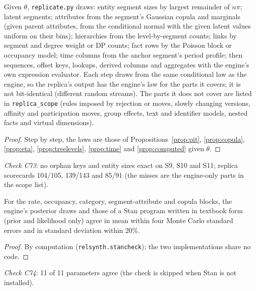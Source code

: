 \begin{proposition}\label{prop:replica}
Given $\theta$, \texttt{replicate.py} draws: entity segment sizes by largest remainder of $n\pi$; latent segments; attributes from the segment's Gaussian copula and marginals (given parent attributes, from the conditional normal with the given latent values uniform on their bins); hierarchies from the level-by-segment counts; links by segment and degree weight or DP counts; fact rows by the Poisson block or occupancy model; time columns from the anchor segment's period profile; then sequences, offset keys, lookups, derived columns and aggregates with the engine's own expression evaluator. Each step draws from the same conditional law as the engine, so the replica's output has the engine's law for the parts it covers; it is not bit-identical (different random streams). The parts it does not cover are listed in \texttt{replica\_scope} (rules imposed by rejection or moves, slowly changing versions, affinity and participation moves, group effects, text and identifier models, nested facts and virtual dimensions).
\end{proposition}
\begin{proof}
Step by step, the laws are those of Propositions~\ref{prop:pit}, \ref{prop:copula}, \ref{prop:eta}, \ref{prop:treelevels}, \ref{prop:time} and \ref{prop:computed} given $\theta$.
\end{proof}
\noindent \emph{Check C73}: no orphan keys and entity sizes exact on S9, S10 and S11; replica scorecards 104/105, 139/143 and 85/91 (the misses are the engine-only parts in the scope list).

\begin{proposition}\label{prop:stan}
For the rate, occupancy, category, segment-attribute and copula blocks, the engine's posterior draws and those of a Stan program written in textbook form (prior and likelihood only) agree in mean within four Monte Carlo standard errors and in standard deviation within 20\%.
\end{proposition}
\begin{proof}
By computation (\texttt{relsynth.stancheck}); the two implementations share no code.
\end{proof}
\noindent \emph{Check C74}: 11 of 11 parameters agree (the check is skipped when Stan is not installed).
